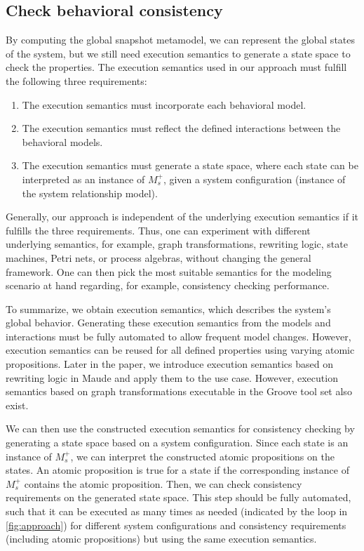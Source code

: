 \documentclass{jot}
\begin{document}
\subsection{Check behavioral consistency}

By computing the global snapshot metamodel, we can represent the global states of the system, but we still need execution semantics to generate a state space to check the properties.
The execution semantics used in our approach must fulfill the following three requirements:
\begin{enumerate}
    \item The execution semantics must incorporate each behavioral model.
    \item The execution semantics must reflect the defined interactions between the behavioral models.
    \item The execution semantics must generate a state space, where each state can be interpreted as an instance of $M_s^+$, given a system configuration (instance of the system relationship model).
\end{enumerate}
Generally, our approach is independent of the underlying execution semantics if it fulfills the three requirements.
Thus, one can experiment with different underlying semantics, for example, graph transformations, rewriting logic, state machines, Petri nets, or process algebras, without changing the general framework.
One can then pick the most suitable semantics for the modeling scenario at hand regarding, for example, consistency checking performance.

To summarize, we obtain execution semantics, which describes the system's global behavior.
Generating these execution semantics from the models and interactions must be fully automated to allow frequent model changes.
However, execution semantics can be reused for all defined properties using varying atomic propositions. 
Later in the paper, we introduce execution semantics based on rewriting logic in Maude and apply them to the use case.
However, execution semantics based on graph transformations executable in the Groove tool set also exist. 

We can then use the constructed execution semantics for consistency checking by generating a state space based on a system configuration.
Since each state is an instance of $M_s^+$, we can interpret the constructed atomic propositions on the states.
An atomic proposition is true for a state if the corresponding instance of $M_s^+$ contains the atomic proposition.
Then, we can check consistency requirements on the generated state space.
This step should be fully automated, such that it can be executed as many times as needed (indicated by the loop in \autoref{fig:approach}) for different system configurations and consistency requirements (including atomic propositions) but using the same execution semantics.
\end{document}
